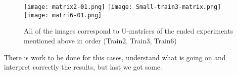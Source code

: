 \documentclass[11pt,fleqn]{book} %
\begin{document}
																																																																																																																																																																																																																																																																																														    \begin{figure}[h!]
																																																																																																																																																																																																																																																																																														    	\centering
																																																																																																																																																																																																																																																																																															    \texttt{[image: matrix2-01.png]}
																																																																																																																																																																																																																																																																																															        \texttt{[image: Small-train3-matrix.png]}
																																																																																																																																																																																																																																																																																																    \texttt{[image: matri6-01.png]}
																																																																																																																																																																																																																																																																																																        \caption{All of the images correspond to U-matrices of the ended experiments mentioned above in order (Train2, Train3, Train6)}
																																																																																																																																																																																																																																																																																																	    \label{img:matrixended}
																																																																																																																																																																																																																																																																																																	    \end{figure}
																																																																																																																																																																																																																																																																																																	     There is work to be done for this cases, understand what is going on and interpret correctly the results, but last we got some.
\end{document}
